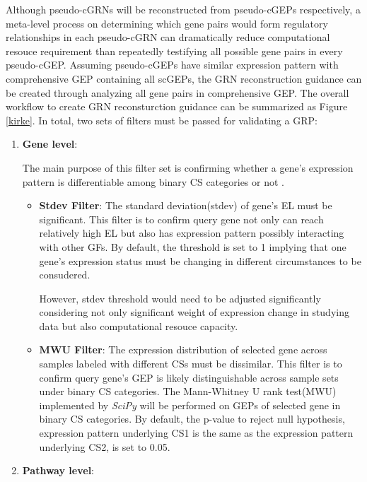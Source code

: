\documentclass[fleqn,10pt]{wlscirep}
\begin{document}
Although pseudo-cGRNs will be reconstructed from pseudo-cGEPs respectively, a meta-level process on determining which gene pairs would form regulatory relationships in each pseudo-cGRN can dramatically reduce computational resouce requirement than repeatedly testifying all possible gene pairs in every pseudo-cGEP.
Assuming pseudo-cGEPs have similar expression pattern with comprehensive GEP containing all scGEPs, the GRN reconstruction guidance can be created through analyzing all gene pairs in comprehensive GEP.
The overall workflow to create GRN reconsturction guidance can be summarized as Figure \ref{kirke}.
In total, two sets of filters must be passed for validating a GRP:
\begin{enumerate}
\setlength\itemsep{0em}
\item {\textbf{Gene level}}:

The main purpose of this filter set is confirming whether a gene's expression pattern is differentiable among binary CS categories or not .
\begin{itemize}
\setlength\itemsep{0em}
\item \textbf{Stdev Filter}: The standard deviation(stdev) of gene's EL must be significant.
This filter is to confirm query gene not only can reach relatively high EL but also has expression pattern possibly interacting with other GFs.
By default, the threshold is set to 1 implying that one gene's expression status must be changing in different circumstances to be consudered.

However, stdev threshold would need to be adjusted significantly considering not only significant weight of expression change in studying data but also computational resouce capacity.

\item \textbf{MWU Filter}: The expression distribution of selected gene across samples labeled with different CSs must be dissimilar.
This filter is to confirm query gene's GEP is likely distinguishable across sample sets under binary CS categories.
The Mann-Whitney U rank test(MWU) implemented by \emph{SciPy}\cite{2020SciPy-NMeth} will be performed on GEPs of selected gene in binary CS categories.
By default, the p-value to reject null hypothesis, expression pattern underlying CS1 is the same as the expression pattern underlying CS2, is set to 0.05.
\end{itemize}

\item {\textbf{Pathway level}}:


\end{enumerate}
\end{document}
